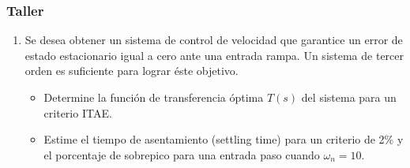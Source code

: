 \documentclass[aspectratio=169,handout]{beamer}
\theoremstyle{definition}
\theoremstyle{plain}
\theoremstyle{remark}
\newcounter{saveenumi}
\newcommand{\conti}{\setcounter{enumi}{\value{saveenumi}}}
\begin{document}
\begin{frame}[c]\frametitle{Taller}
\begin{enumerate}
	\conti
	\item Se desea obtener un sistema de control de velocidad que garantice un error de estado estacionario igual a cero ante una entrada rampa. Un sistema de tercer orden es suficiente para lograr éste objetivo.
	\begin{itemize}
		\item Determine la función de transferencia óptima $T(s)$ del sistema para un criterio ITAE.
		\item Estime el tiempo de asentamiento (settling time) para un criterio de 2\% y el porcentaje de sobrepico para una entrada paso cuando $\omega_n = 10$.
	\end{itemize}
\end{enumerate}
\end{frame}
\end{document}
